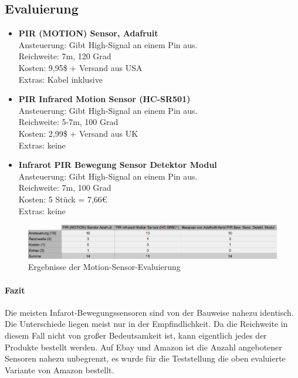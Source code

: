 \subsection{Evaluierung}\label{sub:evaluierung-motion}
\begin{itemize}
\item \textbf{PIR (MOTION) Sensor, Adafruit}\cite{adafruitmotion}\\
Ansteuerung: Gibt High-Signal an einem Pin aus.\\
Reichweite: 7m, 120 Grad\\
Kosten: 9,95\$ + Versand aus USA\\
Extras: Kabel inklusive\\
\item \textbf{PIR Infrared Motion Sensor (HC-SR501)}\cite{hcsr501}\\
Ansteuerung: Gibt High-Signal an einem Pin aus.\\
Reichweite: 5-7m, 100 Grad\\
Kosten: 2,99\$ + Versand aus UK\\
Extras: keine\\
\item \textbf{Infrarot PIR Bewegung Sensor Detektor Modul}\cite{piramazon}\\
Ansteuerung: Gibt High-Signal an einem Pin aus.\\
Reichweite: 7m, 100 Grad\\
Kosten: 5 Stück = 7,66€\\
Extras: keine\\
\end{itemize}
\begin{figure}[h]
\begin{minipage}{\textwidth}
            \centering
            \includegraphics[width=\textwidth]{./data/evaluierung-ms.png}
            \caption{Ergebnisse der Motion-Sensor-Evaluierung}
        \end{minipage}
\end{figure}
\paragraph{Fazit}
Die meisten Infarot-Bewegungssensoren sind von der Bauweise nahezu identisch. Die Unterschiede liegen meist nur in der Empfindlichkeit. Da die Reichweite in diesem Fall nicht von großer Bedeutsamkeit ist, kann eigentlich jedes der Produkte bestellt werden. Auf Ebay und Amazon ist die Anzahl angebotener Sensoren nahezu unbegrenzt, es wurde für die Teststellung die oben evaluierte Variante von Amazon bestellt. 
